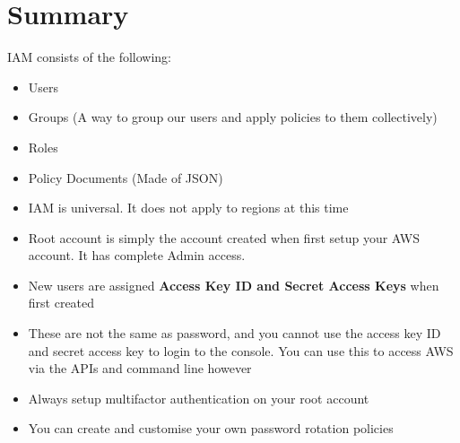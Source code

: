 \documentclass{report}
\begin{document}
\section*{Summary}
IAM consists of the following:
\begin{itemize}

\item
Users

\item
Groups (A way to group our users and apply policies to them collectively)

\item
Roles

\item
Policy Documents (Made of JSON)

\item
IAM is universal. It does not apply to regions at this time

\item
Root account is simply the account created when first setup your AWS account. It has complete Admin access.

\item 
New users are assigned \textbf{Access Key ID and Secret Access Keys} when first created

\item 
These are not the same as password, and you cannot use the access key ID and secret access key to login to the console. You can use this to access AWS via the APIs and command line however

\item
Always setup multifactor authentication on your root account

\item
You can create and customise your own password rotation policies

\end{itemize}
\end{document}
